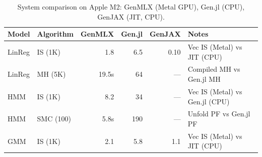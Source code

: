 \begin{table}[t]
\centering
\caption{System comparison on Apple M2: GenMLX (Metal GPU), Gen.jl (CPU), GenJAX (JIT, CPU).}
\label{tab:system-comparison}
\begin{tabular}{l l r r r l}
\toprule
Model & Algorithm & GenMLX & Gen.jl & GenJAX & Notes \\
\midrule
LinReg & IS (1K) & 1.8 & 6.5 & 0.10 & Vec IS (Metal) vs JIT (CPU) \\
LinReg & MH (5K) & 19.5s & 64 & --- & Compiled MH vs Gen.jl MH \\
HMM & IS (1K) & 8.2 & 34 & --- & Vec IS (Metal) vs Gen.jl (CPU) \\
HMM & SMC (100) & 5.8s & 190 & --- & Unfold PF vs Gen.jl PF \\
GMM & IS (1K) & 2.1 & 5.8 & 1.1 & Vec IS (Metal) vs JIT (CPU) \\
\bottomrule
\end{tabular}
\end{table}
